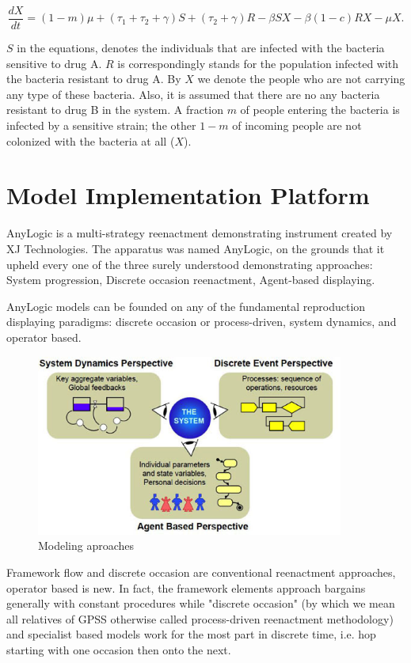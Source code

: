 \begin{equation}
\frac{dX}{dt} = (1 - m) \mu + (\tau_1 + \tau_2 + \gamma) S + (\tau_2 + \gamma) R - \beta S X - \beta (1-c) R X - \mu X.
\end{equation}

$S$ in the equations, denotes the individuals that are infected with the bacteria sensitive to drug A. $R$ is correspondingly stands for the population infected with the bacteria resistant to drug A. By $X$ we denote the people who are not carrying any type of these bacteria. Also, it is assumed that there are no any bacteria resistant to drug B in the system. A fraction $m$ of people entering the bacteria is infected by a sensitive strain; the other $1-m$ of incoming people are not colonized with the bacteria at all ($X$).

\section{Model Implementation Platform}

AnyLogic is a multi-strategy reenactment demonstrating instrument created by XJ Technologies. The apparatus was named AnyLogic, on the grounds that it upheld every one of the three surely understood demonstrating approaches: System progression, Discrete occasion reenactment, Agent-based displaying.

AnyLogic models can be founded on any of the fundamental reproduction displaying paradigms: discrete occasion or process-driven, system dynamics, and operator based.


\begin{figure}
   \centering
	\includegraphics[width=0.9\textwidth]{img/system}
	\caption{Modeling aproaches}
\end{figure}

Framework flow and discrete occasion are conventional reenactment approaches, operator based is new. In fact, the framework elements approach bargains generally with constant procedures while "discrete occasion" (by which we mean all relatives of GPSS otherwise called process-driven reenactment methodology) and specialist based models work for the most part in discrete time, i.e. hop starting with one occasion then onto the next.

